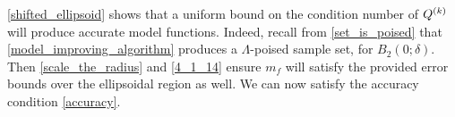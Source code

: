 \documentclass{article}
\begin{document}
\cref{shifted_ellipsoid} shows that a uniform bound on the condition number of ${Q^{(k)}}$ will produce accurate model functions.
Indeed, recall from \cref{set_is_poised} that \cref{model_improving_algorithm} produces a $\Lambda$-poised sample set, for $B_2(0;\delta)$.
Then \cref{scale_the_radius} and \cref{4_1_14} ensure $m_f$ will satisfy the provided error bounds over the ellipsoidal region as well.
We can now satisfy the accuracy condition \cref{accuracy}.








%


\end{document}
